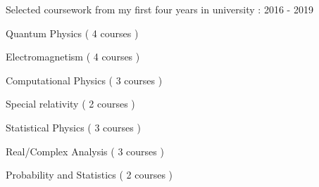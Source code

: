 

\begin{cventries}

  \cventry
    {Selected coursework from my first four years in university : } %
    {} %
    {} %
    {2016 - 2019} %
    {
      \begin{cvitems} %
        \item {Quantum Physics ( 4 courses )}
        \item {Electromagnetism ( 4 courses )}
        \item {Computational Physics ( 3 courses )}
        \item {Special relativity ( 2 courses )}
        \item {Statistical Physics ( 3 courses )}
        \item {Real/Complex Analysis ( 3 courses )}
        \item {Probability and Statistics ( 2 courses )}
      \end{cvitems}
    }

\end{cventries}
